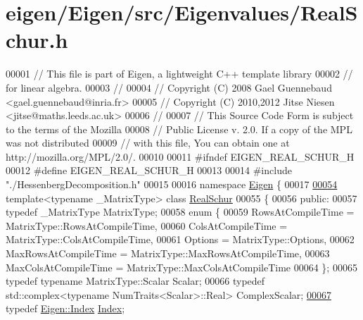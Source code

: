 \hypertarget{eigen_2_eigen_2src_2_eigenvalues_2_real_schur_8h_source}{}\section{eigen/\+Eigen/src/\+Eigenvalues/\+Real\+Schur.h}
\label{eigen_2_eigen_2src_2_eigenvalues_2_real_schur_8h_source}

\begin{DoxyCode}
00001 \textcolor{comment}{// This file is part of Eigen, a lightweight C++ template library}
00002 \textcolor{comment}{// for linear algebra.}
00003 \textcolor{comment}{//}
00004 \textcolor{comment}{// Copyright (C) 2008 Gael Guennebaud <gael.guennebaud@inria.fr>}
00005 \textcolor{comment}{// Copyright (C) 2010,2012 Jitse Niesen <jitse@maths.leeds.ac.uk>}
00006 \textcolor{comment}{//}
00007 \textcolor{comment}{// This Source Code Form is subject to the terms of the Mozilla}
00008 \textcolor{comment}{// Public License v. 2.0. If a copy of the MPL was not distributed}
00009 \textcolor{comment}{// with this file, You can obtain one at http://mozilla.org/MPL/2.0/.}
00010 
00011 \textcolor{preprocessor}{#ifndef EIGEN\_REAL\_SCHUR\_H}
00012 \textcolor{preprocessor}{#define EIGEN\_REAL\_SCHUR\_H}
00013 
00014 \textcolor{preprocessor}{#include "./HessenbergDecomposition.h"}
00015 
00016 \textcolor{keyword}{namespace }\hyperlink{namespace_eigen}{Eigen} \{ 
00017 
\hyperlink{group___eigenvalues___module}{00054} \textcolor{keyword}{template}<\textcolor{keyword}{typename} \_MatrixType> \textcolor{keyword}{class }\hyperlink{group___eigenvalues___module_class_eigen_1_1_real_schur}{RealSchur}
00055 \{
00056   \textcolor{keyword}{public}:
00057     \textcolor{keyword}{typedef} \_MatrixType MatrixType;
00058     \textcolor{keyword}{enum} \{
00059       RowsAtCompileTime = MatrixType::RowsAtCompileTime,
00060       ColsAtCompileTime = MatrixType::ColsAtCompileTime,
00061       Options = MatrixType::Options,
00062       MaxRowsAtCompileTime = MatrixType::MaxRowsAtCompileTime,
00063       MaxColsAtCompileTime = MatrixType::MaxColsAtCompileTime
00064     \};
00065     \textcolor{keyword}{typedef} \textcolor{keyword}{typename} MatrixType::Scalar Scalar;
00066     \textcolor{keyword}{typedef} std::complex<typename NumTraits<Scalar>::Real> ComplexScalar;
\hyperlink{group___eigenvalues___module_a8bd4653e2d9569a44ecc95e746422d3f}{00067}     \textcolor{keyword}{typedef} \hyperlink{namespace_eigen_a62e77e0933482dafde8fe197d9a2cfde}{Eigen::Index} \hyperlink{group___eigenvalues___module_a8bd4653e2d9569a44ecc95e746422d3f}{Index}; 

\end{DoxyCode}
